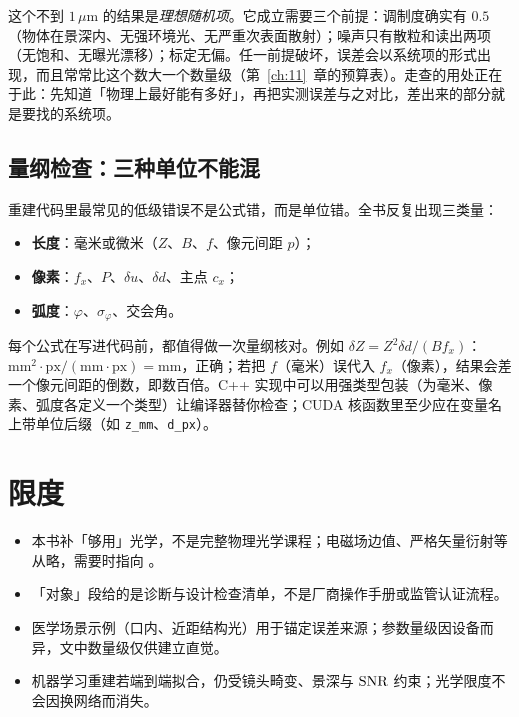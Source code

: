 这个不到 $1\,\mu\mathrm{m}$ 的结果是\emph{理想随机项}。它成立需要三个前提：调制度确实有 $0.5$（物体在景深内、无强环境光、无严重次表面散射）；噪声只有散粒和读出两项（无饱和、无曝光漂移）；标定无偏。任一前提破坏，误差会以系统项的形式出现，而且常常比这个数大一个数量级（第~\ref{ch:11}~章的预算表）。走查的用处正在于此：先知道「物理上最好能有多好」，再把实测误差与之对比，差出来的部分就是要找的系统项。

\subsection{量纲检查：三种单位不能混}

重建代码里最常见的低级错误不是公式错，而是单位错。全书反复出现三类量：
\begin{itemize}
  \item \textbf{长度}：毫米或微米（$Z$、$B$、$f$、像元间距 $p$）；
  \item \textbf{像素}：$f_x$、$P$、$\delta u$、$\delta d$、主点 $c_x$；
  \item \textbf{弧度}：$\varphi$、$\sigma_\varphi$、交会角。
\end{itemize}
\begin{sloppypar}每个公式在写进代码前，都值得做一次量纲核对。例如 $\delta Z=Z^2\delta d/(Bf_x)$：$\mathrm{mm}^2\cdot\mathrm{px}/(\mathrm{mm}\cdot\mathrm{px})=\mathrm{mm}$，正确；若把 $f$（毫米）误代入 $f_x$（像素），结果会差一个像元间距的倒数，即数百倍。C++ 实现中可以用强类型包装（为毫米、像素、弧度各定义一个类型）让编译器替你检查；CUDA 核函数里至少应在变量名上带单位后缀（如 \texttt{z\_mm}、\texttt{d\_px}）。\end{sloppypar}

\section{限度}
\label{sec:ch00-limits}

\begin{itemize}
  \item 本书补「够用」光学，不是完整物理光学课程；电磁场边值、严格矢量衍射等从略，需要时指向 \citep{BornWolf,HechtOptics}。
  \item 「对象」段给的是诊断与设计检查清单，不是厂商操作手册或监管认证流程。
  \item 医学场景示例（口内、近距结构光）用于锚定误差来源；参数量级因设备而异，文中数量级仅供建立直觉。
  \item 机器学习重建若端到端拟合，仍受镜头畸变、景深与 $\mathrm{SNR}$ 约束；光学限度不会因换网络而消失。
\end{itemize}

